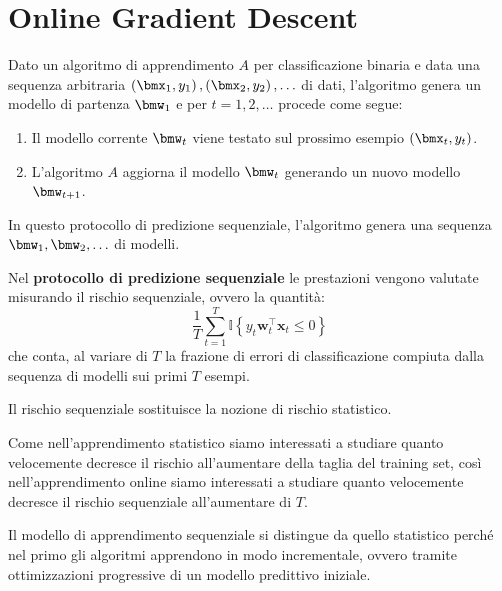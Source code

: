 \documentclass[\main/main.tex]{subfiles}
\begin{document}
\chapter{Online Gradient Descent}
\begin{multicols}{2}
\begin{definition}
    Dato un algoritmo di apprendimento \(A\) per classificazione binaria e data una sequenza arbitraria \(\rnd{\bmx_1, y_1}, \rnd{\bmx_2, y_2}, \ldots\) di dati, l'algoritmo genera un modello di partenza \(\bmw_1\) e per \(t=1,2,\ldots\) procede come segue:
    \begin{enumerate}
        \item Il modello corrente \(\bmw_t\) viene testato sul prossimo esempio \(\rnd{\bmx_t, y_t}\).
        \item L'algoritmo \(A\) aggiorna il modello \(\bmw_t\) generando un nuovo modello \(\bmw_{t+1}\).
    \end{enumerate}
    In questo protocollo di predizione sequenziale, l'algoritmo genera una sequenza \(\bmw_1, \bmw_2, \ldots\) di modelli.
\end{definition}
\begin{definition}
    Nel \textbf{protocollo di predizione sequenziale} le prestazioni vengono valutate misurando il rischio sequenziale, ovvero la quantità:
    \[\frac{1}{T} \sum_{t=1}^{T} \mathbb{I}\left\{y_{t} \boldsymbol{w}_{t}^{\top} \boldsymbol{x}_{t} \leq 0\right\}\]
    che conta, al variare di \(T\) la frazione di errori di classificazione compiuta dalla sequenza di modelli sui primi \(T\) esempi.
    
    Il rischio sequenziale sostituisce la nozione di rischio statistico.
\end{definition}
\begin{observation}
    Come nell'apprendimento statistico siamo interessati a studiare quanto velocemente decresce il rischio all'aumentare della taglia del training set, così nell'apprendimento online siamo interessati a studiare quanto velocemente decresce il rischio sequenziale all'aumentare di \(T\).
\end{observation}
\begin{observation}
    Il modello di apprendimento sequenziale si distingue da quello statistico perché nel primo gli algoritmi apprendono in modo incrementale, ovvero tramite ottimizzazioni progressive di un modello predittivo iniziale.
    

\end{observation}
\end{multicols}
\end{document}
